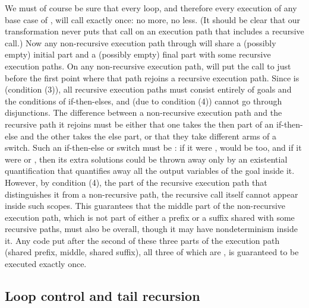 We must of course be sure that every loop,
and therefore every execution of any base case of ,
will call \lcfinish exactly once: no more, no less.
(It should be clear that our transformation never puts that call
on an execution path that includes a recursive call.)
Now any non-recursive execution path through 
will share a (possibly empty) initial part
and a (possibly empty) final part with some recursive execution paths.
On any non-recursive execution path,
\putbarriers will put the call to \lcfinish
just before the first point where that path
rejoins a recursive execution path.
Since  is \ddet (condition (3)),
all recursive execution paths must consist
entirely of \ddet goals and the conditions of if-then-elses,
and (due to condition (4)) cannot go through disjunctions.
The difference between a non-recursive execution path
and the recursive path it rejoins
must be either that
one takes the then part of an if-then-else and the other takes the else part,
or that they take different arms of a switch.
Such an if-then-else or switch must be \ddet:
if it were \dsemidet,  would be too,
and if it were \dnondet or \dmulti,
then its extra solutions could be thrown away
only by an existential quantification that quantifies away
all the output variables of the goal inside it.
However, by condition (4),
the part of the recursive execution path
that distinguishes it from a non-recursive path,
the recursive call itself
cannot appear inside such scopes.
This guarantees that the middle part of the non-recursive execution path,
which is not part of either
a prefix or a suffix shared with some recursive paths,
must also be \ddet overall,
though it may have nondeterminism inside it.
Any code put after the second of these three parts of the execution path
(shared prefix, middle, shared suffix),
all three of which are \ddet,
is guaranteed to be executed exactly once.


\subsection{Loop control and tail recursion}
\label{sec:lc_tailrec}


